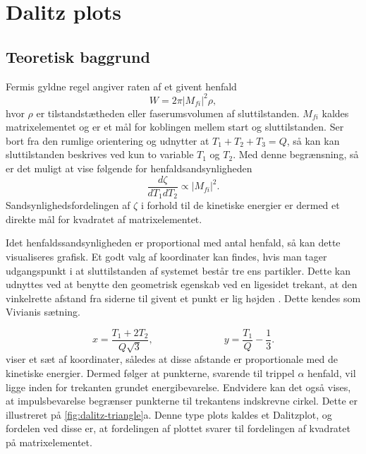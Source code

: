\chapter{Dalitz plots}
\label{cha:dalitz-plots}

\section{Teoretisk baggrund}
\label{sec:dalitz-teori}

Fermis gyldne regel angiver raten af et givent henfald \cite[s. 16]{Bettini}
\begin{equation}
  \label{eq:fermi}
  W = 2\pi|M_{fi}|^{2}\rho,
\end{equation}
hvor $\rho$ er tilstandstætheden eller faserumsvolumen af sluttilstanden. $M_{fi}$ kaldes
matrixelementet og er et mål for koblingen mellem start og sluttilstanden. Ser bort fra den rumlige
orientering og udnytter at $T_{1} + T_{2} + T_{3} = Q$, så kan kan sluttilstanden beskrives ved kun
to variable $T_{1}$ og $T_{2}$. Med denne begrænsning, så er det muligt at vise følgende for
henfaldsandsynligheden \cite{Kallen}
\begin{equation}
  \label{eq:DOS}
  \frac{d\zeta}{dT_{1}dT_{2}} \propto |M_{fi}|^{2}.
\end{equation}
Sandsynlighedsfordelingen af $\zeta$ i forhold til de kinetiske energier er dermed et direkte mål for
kvadratet af matrixelementet. 

Idet henfaldssandsynligheden er proportional med antal henfald, så kan dette visualiseres
grafisk. Et godt valg af koordinater kan findes, hvis man tager udgangspunkt i at sluttilstanden af
systemet består tre ens partikler. Dette kan udnyttes ved at benytte den geometrisk egenskab ved en
ligesidet trekant, at den vinkelrette afstand fra siderne til givent et punkt er lig højden \cite{dalitz}. Dette
kendes som Vivianis sætning.


\begin{equation}
  \label{eq:dalitz}
  x = \frac{T_{1}+2T_{2}}{Q\sqrt{3}}, \hspace{3cm} y = \frac{T_{1}}{Q} - \frac{1}{3}.
\end{equation}
 viser et sæt af koordinater, således at disse afstande er proportionale med de
kinetiske energier. Dermed følger at punkterne, svarende til trippel $\alpha$ henfald, vil ligge inden
for trekanten grundet energibevarelse. Endvidere kan det også vises, at impulsbevarelse begrænser
punkterne til trekantens indskrevne cirkel. Dette er illustreret på
\cref{fig:dalitz-triangle}a. Denne type plots kaldes et Dalitzplot, og fordelen ved disse er, at
fordelingen af plottet svarer til fordelingen af kvadratet på matrixelementet. 

